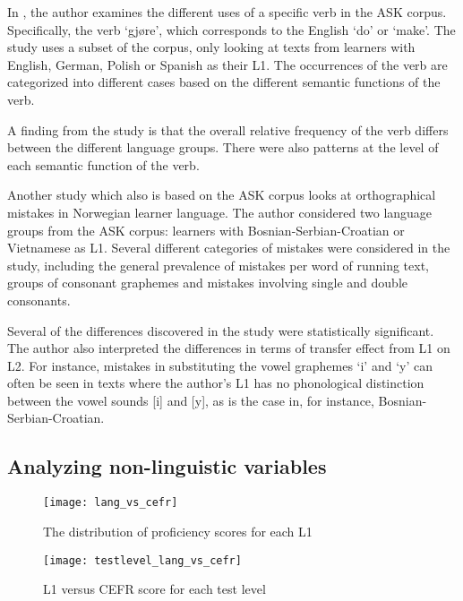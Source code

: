 In \textcite{golden2016ask}, the author examines the different uses of a
specific verb in the ASK corpus. Specifically, the verb `gjøre', which
corresponds to the English `do' or `make'. The study uses a subset of the
corpus, only looking at texts from learners with English, German, Polish or
Spanish as their \ac{L1}. The occurrences of the verb are categorized into
different cases based on the different semantic functions of the verb.

A finding from the study is that the overall relative frequency of the verb
differs between the different language groups. There were also patterns at
the level of each semantic function of the verb.

Another study \autocite{vigrestad2016} which also is based on the ASK corpus
looks at orthographical mistakes in Norwegian learner language. The author
considered two language groups from the ASK corpus: learners with
Bosnian-Serbian-Croatian or Vietnamese as \ac{L1}. Several different
categories of mistakes were considered in the study, including the general
prevalence of mistakes per word of running text, groups of consonant
graphemes and mistakes involving single and double consonants.

Several of the differences discovered in the study were statistically
significant. The author also interpreted the differences in terms of transfer
effect from \ac{L1} on \ac{L2}. For instance, mistakes in substituting the
vowel graphemes `i' and `y' can often be seen in texts where the author's L1
has no phonological distinction between the vowel sounds [i] and [y], as is
the case in, for instance, Bosnian-Serbian-Croatian.


\subsection{Analyzing non-linguistic variables}

\begin{figure}
  \centering
  \texttt{[image: lang\_vs\_cefr]}
  \caption{The distribution of proficiency scores for each L1}
  \label{fig:lang-vs-cefr}
\end{figure}
 
\begin{figure}
  \centering
  \texttt{[image: testlevel\_lang\_vs\_cefr]}
  \caption{L1 versus CEFR score for each test level}
  \label{fig:testlevel-lang-vs-cefr}
\end{figure}

